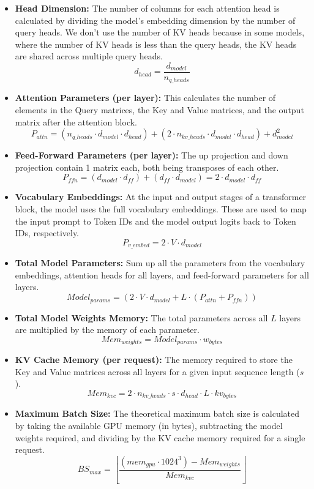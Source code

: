 \documentclass{article}
\begin{document}
\begin{itemize}
    \item \textbf{Head Dimension:} The number of columns for each attention head is calculated by dividing the model's embedding dimension by the number of query heads. We don't use the number of KV heads because in some models, where the number of KV heads is less than the query heads, the KV heads are shared across multiple query heads.
    $$d_{head} = \frac{d_{model}}{n_{q\_heads}}$$

    \item \textbf{Attention Parameters (per layer):} This calculates the number of elements in the Query matrices, the Key and Value matrices, and the output matrix after the attention block.
    $$P_{attn} = (n_{q\_heads} \cdot d_{model} \cdot d_{head}) + (2 \cdot n_{kv\_heads} \cdot d_{model} \cdot d_{head}) + d_{model}^2$$

    \item \textbf{Feed-Forward Parameters (per layer):} The up projection and down projection contain 1 matrix each, both being transposes of each other.
    $$P_{ffn} = (d_{model} \cdot d_{ff}) + (d_{ff} \cdot d_{model}) = 2 \cdot d_{model} \cdot d_{ff}$$

    \item \textbf{Vocabulary Embeddings:} At the input and output stages of a transformer block, the model uses the full vocabulary embeddings. These are used to map the input prompt to Token IDs and the model output logits back to Token IDs, respectively.
    $$P_{v\_embed} = 2 \cdot V \cdot d_{model}$$

    \item \textbf{Total Model Parameters:} Sum up all the parameters from the vocabulary embeddings, attention heads for all layers, and feed-forward parameters for all layers.
    $$Model_{params} = \left(2 \cdot V \cdot d_{model} + L \cdot (P_{attn} + P_{ffn})\right)$$

    \item \textbf{Total Model Weights Memory:} The total parameters across all $L$ layers are multiplied by the memory of each parameter.
    $$Mem_{weights} = Model_{params} \cdot w_{bytes}$$

    \item \textbf{KV Cache Memory (per request):} The memory required to store the Key and Value matrices across all layers for a given input sequence length ($s$). $$Mem_{kvc} = 2 \cdot n_{kv\_heads} \cdot s \cdot d_{head} \cdot L \cdot kv_{bytes}$$

    \item \textbf{Maximum Batch Size:} The theoretical maximum batch size is calculated by taking the available GPU memory (in bytes), subtracting the model weights required, and dividing by the KV cache memory required for a single request.
    $$BS_{max} = \left\lfloor \frac{(mem_{gpu} \cdot 1024^3) - Mem_{weights}}{Mem_{kvc}} \right\rfloor$$
\end{itemize}
\end{document}
